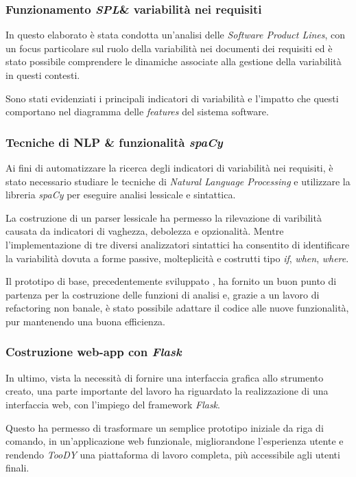 \documentclass[12pt]{report}
\newcommand{\toody}{\textsl{TooDY}\xspace}
\newcommand{\flask}{\textsl{Flask}\xspace}
\newcommand{\spacy}{\textsl{spaCy}\xspace}
\newcommand{\spl}{\textsl{SPL}\xspace}
\begin{document}
\subsubsection{Funzionamento \spl \& variabilità nei requisiti}
In questo elaborato è stata condotta un'analisi delle \textit{Software Product Lines}, con un focus particolare sul ruolo della variabilità nei documenti dei requisiti ed è stato possibile comprendere le dinamiche associate alla gestione della variabilità in questi contesti.

Sono stati evidenziati i principali indicatori di variabilità e l'impatto che questi comportano nel diagramma delle \textit{features} del sistema software.

\subsubsection{Tecniche di NLP \& funzionalità \spacy}
Ai fini di automatizzare la ricerca degli indicatori di variabilità nei requisiti, è stato necessario studiare le tecniche di \textit{Natural Language Processing} e utilizzare la libreria \spacy per eseguire analisi lessicale e sintattica.

La costruzione di un parser lessicale ha permesso la rilevazione di varibilità causata da indicatori di vaghezza, debolezza e opzionalità. Mentre l'implementazione di tre diversi analizzatori sintattici ha consentito di identificare la variabilità dovuta a forme passive, molteplicità e costrutti tipo \textit{if}, \textit{when}, \textit{where}.

Il prototipo di base, precedentemente sviluppato \cite{livi}, ha fornito un buon punto di partenza per la costruzione delle funzioni di analisi e, grazie a un lavoro di refactoring non banale, è stato possibile adattare il codice alle nuove funzionalità, pur mantenendo una buona efficienza.

\subsubsection{Costruzione web-app con \flask}
In ultimo, vista la necessità di fornire una interfaccia grafica allo strumento creato, una parte importante del lavoro ha riguardato la realizzazione di una interfaccia web, con l'impiego del framework \flask.

Questo ha permesso di trasformare un semplice prototipo iniziale da riga di comando, in un'applicazione web funzionale, migliorandone l'esperienza utente e rendendo \toody una piattaforma di lavoro completa, più accessibile agli utenti finali.
\end{document}
